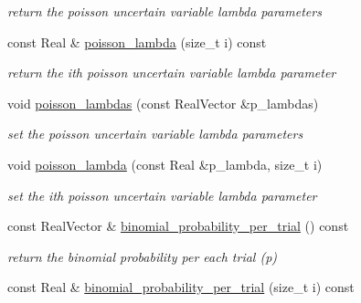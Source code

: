 \begin{DoxyCompactItemize}
\begin{DoxyCompactList}\small\item\em return the poisson uncertain variable lambda parameters \end{DoxyCompactList}\item 
const Real \& \hyperlink{classPecos_1_1AleatoryDistParams_a308d21d41ce36a5d68bad6cd8b9cea37}{poisson\+\_\+lambda} (size\+\_\+t i) const \label{classPecos_1_1AleatoryDistParams_a308d21d41ce36a5d68bad6cd8b9cea37}

\begin{DoxyCompactList}\small\item\em return the ith poisson uncertain variable lambda parameter \end{DoxyCompactList}\item 
void \hyperlink{classPecos_1_1AleatoryDistParams_aebc9cd24fbd320b1dde328039257275d}{poisson\+\_\+lambdas} (const Real\+Vector \&p\+\_\+lambdas)\label{classPecos_1_1AleatoryDistParams_aebc9cd24fbd320b1dde328039257275d}

\begin{DoxyCompactList}\small\item\em set the poisson uncertain variable lambda parameters \end{DoxyCompactList}\item 
void \hyperlink{classPecos_1_1AleatoryDistParams_ac21923d68debba5680d67acd664540e7}{poisson\+\_\+lambda} (const Real \&p\+\_\+lambda, size\+\_\+t i)\label{classPecos_1_1AleatoryDistParams_ac21923d68debba5680d67acd664540e7}

\begin{DoxyCompactList}\small\item\em set the ith poisson uncertain variable lambda parameter \end{DoxyCompactList}\item 
const Real\+Vector \& \hyperlink{classPecos_1_1AleatoryDistParams_ae405d66ca534f6c8a5ba34d492491941}{binomial\+\_\+probability\+\_\+per\+\_\+trial} () const \label{classPecos_1_1AleatoryDistParams_ae405d66ca534f6c8a5ba34d492491941}

\begin{DoxyCompactList}\small\item\em return the binomial probability per each trial (p) \end{DoxyCompactList}\item 
const Real \& \hyperlink{classPecos_1_1AleatoryDistParams_accbdbdcb317bcbe96b318aca8bd2bbd6}{binomial\+\_\+probability\+\_\+per\+\_\+trial} (size\+\_\+t i) const \label{classPecos_1_1AleatoryDistParams_accbdbdcb317bcbe96b318aca8bd2bbd6}


\end{DoxyCompactItemize}
